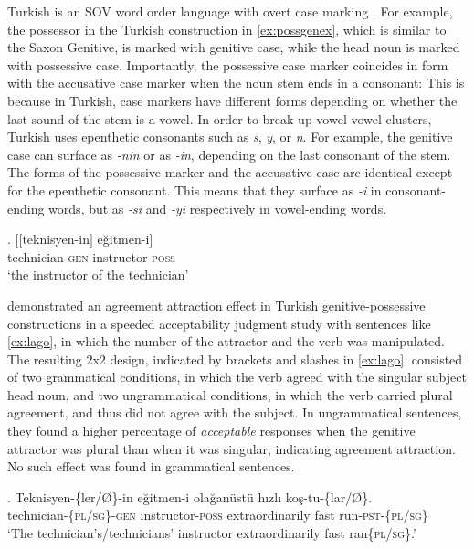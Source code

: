 \documentclass[apacite,linguex]{glossa}\usepackage[]{graphicx}\usepackage[]{color}
\begin{document}
Turkish is an SOV word order language with overt case marking \citep{GokselKerslake:2005,Kornfilt:2011,Kornfilt:2013}. 
For example, the possessor in the Turkish construction in \ref{ex:possgenex}, which is similar to the Saxon Genitive, is marked with genitive case, while the head noun is marked with possessive case. 
Importantly, the possessive case marker coincides in form with the accusative case marker when the noun stem ends in a consonant: 
This is because in Turkish, case markers have different forms depending on whether the last sound of the stem is a vowel. In order to break up vowel-vowel clusters, Turkish uses epenthetic consonants such as \textit{s}, \textit{y}, or \textit{n}.  For example, the genitive case can surface as \textit{-nin} or as \textit{-in}, depending on the last consonant of the stem. The forms of the possessive marker and the accusative case are identical except for the epenthetic consonant. This means that they surface as \textit{-i} in consonant-ending words, but as \textit{-si} and \textit{-yi} respectively in vowel-ending words. 

\ex. \label{ex:possgenex}
\gll $[$$[$teknisyen-in$]$ e\u{g}itmen-i$]$ \\
    technician-\textsc{gen} instructor-\textsc{poss} \\
\glt `the instructor of the technician'


\citet{LagoEtAl:2019} demonstrated an agreement attraction effect in Turkish genitive-possessive constructions in a speeded acceptability judgment study with sentences like \ref{ex:lago}, in which the number of the attractor and the verb was manipulated. The resulting $2$x$2$ design, indicated by brackets and slashes in \ref{ex:lago}, consisted of two grammatical conditions, in which the verb agreed with the singular subject head noun, and two ungrammatical conditions, in which the verb carried plural agreement, and thus did not agree with the subject. In ungrammatical sentences, they found a higher percentage of \textit{acceptable} responses when the genitive attractor was plural than when it was singular, indicating agreement attraction. No such effect was found in grammatical sentences.


\ex. \label{ex:lago}
\gll Teknisyen-\{ler/\O\}-in e\u{g}itmen-i ola\u{g}an{\"u}st{\"u} h{\i}zl{\i} ko\c{s}-tu-\{lar/\O\}.\\
technician-\{\textsc{pl}/\textsc{sg}\}-\textsc{gen} instructor-\textsc{poss} extraordinarily fast run-\textsc{pst}-\{\textsc{pl}/\textsc{sg}\}\\
\glt `The technician's/technicians' instructor extraordinarily fast ran\{\textsc{pl}/\textsc{sg}\}.'
\end{document}
